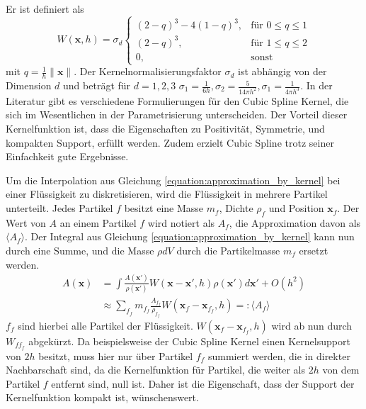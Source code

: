 \documentclass{scrreprt}
\begin{document}
Er ist definiert als
\begin{equation}
    W(\textbf{x}, h) = \sigma_d \begin{cases}
        (2-q)^3 - 4(1-q)^3, &\text{für } 0 \leq q \leq 1\\
        (2-q)^3, &\text{für } 1 \leq q \leq 2\\
        0, &\text{sonst}
    \end{cases}
\end{equation}
mit $q = \frac{1}{h}\|\textbf{x}\|$. Der Kernelnormalisierungsfaktor $\sigma_d$ ist abhängig von der Dimension $d$
und beträgt für $d = 1,2,3$ $\sigma_1 = \frac{1}{6h}, \sigma_2 = \frac{5}{14\pi h^2}, \sigma_1 = \frac{1}{4\pi h^3}$.
In der Literatur gibt es verschiedene Formulierungen für den Cubic Spline Kernel, die sich im Wesentlichen in der Parametrisierung unterscheiden.
Der Vorteil dieser Kernelfunktion ist, dass die Eigenschaften zu Positivität, Symmetrie, und kompakten Support, erfüllt werden.
Zudem erzielt Cubic Spline trotz seiner Einfachkeit gute Ergebnisse.

Um die Interpolation aus Gleichung \ref{equation:approximation_by_kernel} bei einer Flüssigkeit zu diskretisieren,
wird die Flüssigkeit in mehrere Partikel unterteilt. Jedes Partikel $f$ besitzt eine Masse $m_f$, Dichte $\rho_f$ und Position $\textbf{x}_f$.
Der Wert von $A$ an einem Partikel $f$ wird notiert als $A_f$, die Approximation davon als $\langle A_f \rangle$.
Der Integral aus Gleichung \ref{equation:approximation_by_kernel} kann nun durch eine Summe, und die Masse $\rho dV$ durch die Partikelmasse $m_f$ ersetzt werden.
\begin{align}
    A(\textbf{x}) &= \int \frac{A(\textbf{x}')}{\rho(\textbf{x}')} W(\textbf{x} - \textbf{x}', h) \rho(\textbf{x}')d\textbf{x}' + O(h^2)\\
                  &\approx \sum_{f_f} m_{f_f} \frac{A_{f_f}}{\rho_{f_f}} W(\textbf{x}_f - \textbf{x}_{f_f}, h) =: \langle A_f \rangle
\end{align}
$f_f$ sind hierbei alle Partikel der Flüssigkeit.
$W(\textbf{x}_f - \textbf{x}_{f_f}, h)$ wird ab nun durch $W_{ff_f}$ abgekürzt.
Da beispielsweise der Cubic Spline Kernel einen Kernelsupport von $2h$ besitzt, muss hier nur über Partikel $f_f$ summiert werden, die in direkter Nachbarschaft sind,
da die Kernelfunktion für Partikel, die weiter als $2h$ von dem Partikel $f$ entfernt sind, null ist.
Daher ist die Eigenschaft, dass der Support der Kernelfunktion kompakt ist, wünschenswert.
\end{document}
